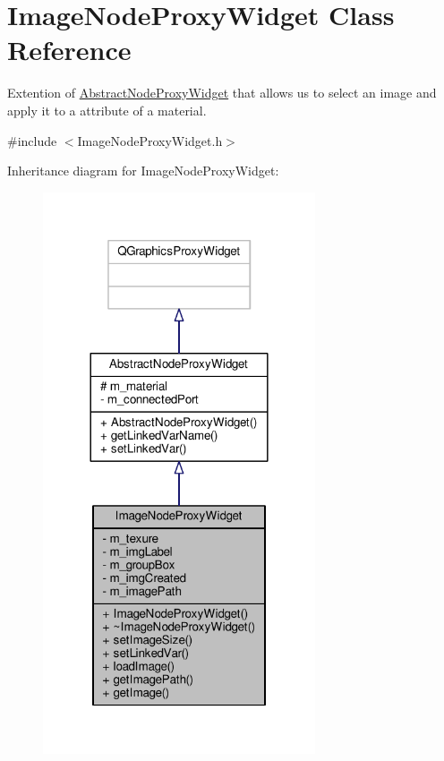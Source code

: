 \hypertarget{class_image_node_proxy_widget}{\section{Image\-Node\-Proxy\-Widget Class Reference}
\label{class_image_node_proxy_widget}
}


Extention of \hyperlink{class_abstract_node_proxy_widget}{Abstract\-Node\-Proxy\-Widget} that allows us to select an image and apply it to a attribute of a material.  




{\ttfamily \#include $<$Image\-Node\-Proxy\-Widget.\-h$>$}



Inheritance diagram for Image\-Node\-Proxy\-Widget\-:
\nopagebreak
\begin{figure}[H]
\begin{center}
\leavevmode
\includegraphics[width=228pt]{class_image_node_proxy_widget__inherit__graph}
\end{center}
\end{figure}


